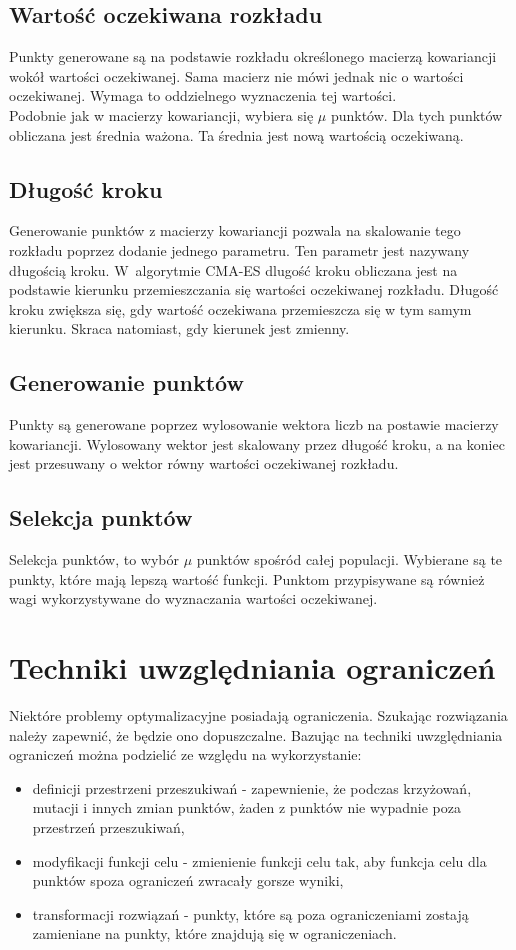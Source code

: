 \documentclass{mini}
\begin{document}
\subsection{Wartość oczekiwana rozkładu}
Punkty generowane są na podstawie rozkładu określonego macierzą kowariancji wokół wartości oczekiwanej. Sama macierz nie mówi jednak nic o wartości oczekiwanej. Wymaga to oddzielnego wyznaczenia tej wartości.\\
Podobnie jak w macierzy kowariancji, wybiera się $\mu$ punktów. Dla tych punktów obliczana jest średnia ważona. Ta średnia jest nową wartością oczekiwaną.

\subsection{Długość kroku}
Generowanie punktów z macierzy kowariancji pozwala na skalowanie tego rozkładu poprzez dodanie jednego parametru. Ten parametr jest nazywany długością kroku. W~algorytmie CMA-ES dlugość kroku obliczana jest na podstawie kierunku przemieszczania się wartości oczekiwanej rozkładu. Długość kroku zwiększa się, gdy wartość oczekiwana przemieszcza się w tym samym kierunku. Skraca natomiast, gdy kierunek jest zmienny.

\subsection{Generowanie punktów}
Punkty są generowane poprzez wylosowanie wektora liczb na postawie macierzy kowariancji. Wylosowany wektor jest skalowany przez długość kroku, a na koniec jest przesuwany o wektor równy wartości oczekiwanej rozkładu.

\subsection{Selekcja punktów}
Selekcja punktów, to wybór $\mu$ punktów spośród całej populacji. Wybierane są te punkty, które mają lepszą wartość funkcji. Punktom przypisywane są również wagi wykorzystywane do wyznaczania wartości oczekiwanej.

\pagebreak

\section{Techniki uwzględniania ograniczeń}
Niektóre problemy optymalizacyjne posiadają ograniczenia. Szukając rozwiązania należy zapewnić, że będzie ono dopuszczalne. Bazując na \cite{wyklady} techniki uwzględniania ograniczeń można podzielić ze względu na wykorzystanie:
\begin{itemize}[noitemsep]
\item definicji przestrzeni przeszukiwań - zapewnienie, że podczas krzyżowań, mutacji i innych zmian punktów, żaden z punktów nie wypadnie poza przestrzeń przeszukiwań,
\item modyfikacji funkcji celu - zmienienie funkcji celu tak, aby funkcja celu dla punktów spoza ograniczeń zwracały gorsze wyniki,
\item transformacji rozwiązań - punkty, które są poza ograniczeniami zostają zamieniane na punkty, które znajdują się w ograniczeniach.
\end{itemize}
\end{document}
